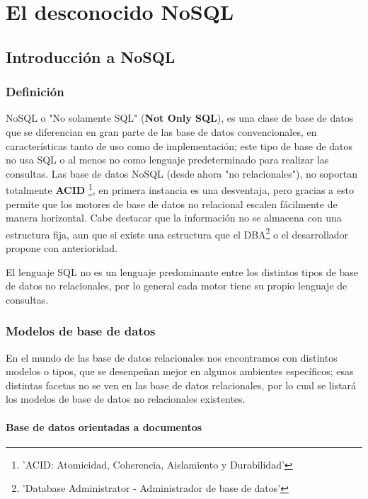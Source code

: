 \part{El desconocido NoSQL} 
\chapter{Introducci\'on a NoSQL}

\section{Definici\'on}

NoSQL o "No solamente SQL" ({\bf Not Only SQL}), es una clase de base de datos que se diferencian en gran parte de las base de datos convencionales, en caracter\'isticas tanto de uso como de implementaci\'on; este tipo de base de datos no usa SQL o al menos no como lenguaje predeterminado para realizar las consultas. Las base de datos NoSQL (desde ahora "no relacionales"), no soportan totalmente {\bf ACID} \footnote{'ACID: Atomicidad, Coherencia, Aislamiento y Durabilidad'}, en primera instancia es una desventaja, pero gracias a esto permite que los motores de base de datos no relacional escalen f\'acilmente de manera horizontal. Cabe destacar que la informaci\'on no se almacena con una estructura fija, aun que si existe una estructura que el DBA\footnote{'Database Administrator - Administrador de base de datos'} o el desarrollador propone con anterioridad.

El lenguaje SQL no es un lenguaje predominante entre los distintos tipos de base de datos no relacionales, por lo general cada motor tiene su propio lenguaje de consultas.

\section{Modelos de base de datos}

En el mundo de las base de datos relacionales nos encontramos con distintos modelos o tipos, que se desenpe\~nan mejor en algunos ambientes espec\'ificos; esas distintas facetas no se ven en las base de datos relacionales, por lo cual se listar\'a los modelos de base de datos no relacionales existentes.

\subsection{Base de datos orientadas a documentos}

